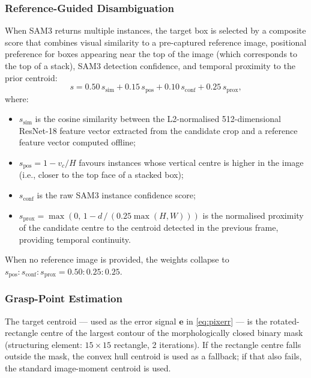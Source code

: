\documentclass[lettersize,journal]{IEEEtran}
\begin{document}
\subsubsection{Reference-Guided Disambiguation}
\label{sec:disambiguation}

When SAM3 returns multiple instances, the target box is selected by a
composite score that combines visual similarity to a pre-captured reference
image, positional preference for boxes appearing near the top of the image
(which corresponds to the top of a stack), SAM3 detection confidence, and
temporal proximity to the prior centroid:
\begin{equation}
  s = 0.50\,s_{\text{sim}} + 0.15\,s_{\text{pos}} + 0.10\,s_{\text{conf}}
      + 0.25\,s_{\text{prox}},
  \label{eq:disambig}
\end{equation}
where:
\begin{itemize}
  \item $s_{\text{sim}}$ is the cosine similarity between the L2-normalised
        512-dimensional ResNet-18 feature vector extracted from the
        candidate crop and a reference feature vector computed offline;
  \item $s_{\text{pos}} = 1 - v_c / H$ favours instances whose vertical
        centre is higher in the image (i.e., closer to the top face of a
        stacked box);
  \item $s_{\text{conf}}$ is the raw SAM3 instance confidence score;
  \item $s_{\text{prox}} = \max(0,\, 1 - d\,/\,(0.25\max(H,W)))$ is the
        normalised proximity of the candidate centre to the centroid
        detected in the previous frame, providing temporal continuity.
\end{itemize}
When no reference image is provided, the weights collapse to
$s_{\text{pos}}:s_{\text{conf}}:s_{\text{prox}} = 0.50:0.25:0.25$.

\subsubsection{Grasp-Point Estimation}
\label{sec:centroid}

The target centroid --- used as the error signal $\mathbf{e}$ in
\eqref{eq:pixerr} --- is the rotated-rectangle centre of the largest
contour of the morphologically closed binary mask (structuring element:
$15\times15$ rectangle, 2 iterations). If the rectangle centre falls outside
the mask, the convex hull centroid is used as a fallback; if that also fails,
the standard image-moment centroid is used.
\end{document}
